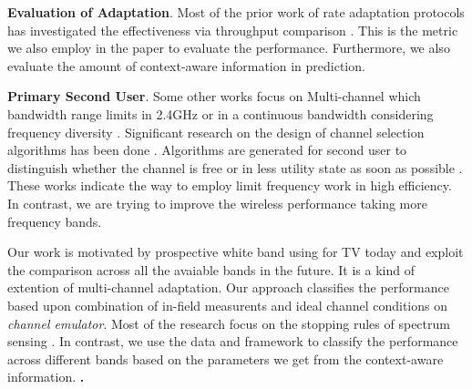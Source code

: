\textbf{Evaluation of Adaptation}. Most of the prior work of rate adaptation protocols has investigated the effectiveness via throughput comparison \cite{camp2010modulation}. This is the metric we also employ in the paper to evaluate the performance. Furthermore, we also evaluate the amount of context-aware information in prediction.
 
\textbf{Primary Second User}. Some other works focus on Multi-channel which bandwidth range limits in 2.4GHz \cite{MOAR} or in a continuous bandwidth considering frequency diversity \cite{rahul2009frequency}. Significant research on the design of channel selection algorithms has been done \cite{radunovic2011dynamic,raniwala2005architecture}. Algorithms are generated for second user to distinguish whether the channel is free or in less utility state as soon as possible \cite{cordeiro2007c}. These works indicate the way to employ limit frequency work in high efficiency. In contrast, we are trying to improve the wireless performance taking more frequency bands.

Our work is motivated by prospective white band using for TV today and exploit the comparison across all the avaiable bands in the future. It is a kind of extention of multi-channel adaptation. Our approach classifies the performance based upon combination of in-field measurents and ideal channel conditions on \emph{channel emulator}. Most of the research focus on the stopping rules of spectrum sensing \cite{sabharwal2007opportunistic, OAR}. In contrast, we use the data and framework to classify the performance across different bands based on the parameters we get from the context-aware information.
{\bf .} 

